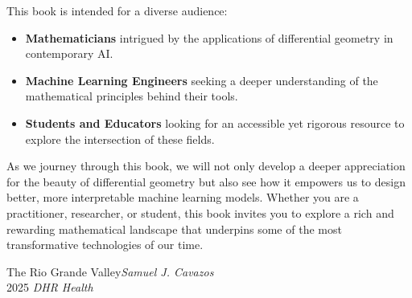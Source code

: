 This book is intended for a diverse audience:
\begin{itemize}
    \item \textbf{Mathematicians} intrigued by the applications of differential geometry in contemporary AI.
    \item \textbf{Machine Learning Engineers} seeking a deeper understanding of the mathematical principles behind their tools.
    \item \textbf{Students and Educators} looking for an accessible yet rigorous resource to explore the intersection of these fields.
\end{itemize}

As we journey through this book, we will not only develop a deeper appreciation for the beauty of differential geometry but also see how it empowers us to design better, more interpretable machine learning models. Whether you are a practitioner, researcher, or student, this book invites you to explore a rich and rewarding mathematical landscape that underpins some of the most transformative technologies of our time.

\vspace{\baselineskip}
\begin{flushright}\noindent
The Rio Grande Valley\hfill {\it Samuel J. Cavazos}\\
2025 \hfill {\it DHR Health}\\
\end{flushright}


